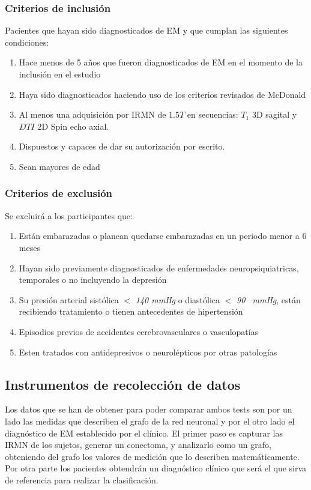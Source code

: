 \documentclass[fleqn,12pt]{UICArticle} %
\begin{document}
\subsubsection{Criterios de inclusión}
Pacientes que hayan sido diagnosticados de EM y que cumplan las siguientes condiciones:
\begin{enumerate}[noitemsep]
\item Hace menos de 5 años que fueron diagnosticados de EM en el momento de la inclusión en el estudio
\item Haya sido diagnosticados haciendo uso de los criterios revisados de McDonald
\item Al menos una adquisición por IRMN de $1.5T$ en secuencias: $T_1$ 3D sagital y $DTI$ 2D Spin echo axial.
\item Dispuestos y capaces de dar su autorización por escrito.
\item Sean mayores de edad
\end{enumerate}

\subsubsection{Criterios de exclusión}
Se excluirá a los participantes que:
\begin{enumerate}[noitemsep]
\item Están embarazadas o planean quedarse embarazadas en un periodo menor a 6 meses
\item Hayan sido previamente diagnosticados de enfermedades neuropsiquiatricas, temporales o no incluyendo la depresión
\item Su presión arterial sistólica $<$ \textit{140 mmHg} o diastólica $<$ \textit{90 ~mmHg}, están recibiendo tratamiento o tienen antecedentes de hipertensión
\item Episodios previos de accidentes cerebrovasculares o vasculopatías
\item Esten tratados con antidepresivos o neurolépticos por otras patologías
\end{enumerate}


\subsection{Instrumentos de recolección de datos}

Los datos que se han de obtener para poder comparar ambos tests son por un lado las medidas que describen el grafo de la red neuronal y por el otro lado el diagnóstico de EM establecido por el clínico. El primer paso es capturar las IRMN de los sujetos, generar un conectoma, y analizarlo como un grafo, obteniendo del grafo los valores de medición que lo describen matemáticamente. Por otra parte los pacientes obtendrán un diagnóstico clínico que será el que sirva de referencia para realizar la clasificación.
\end{document}
